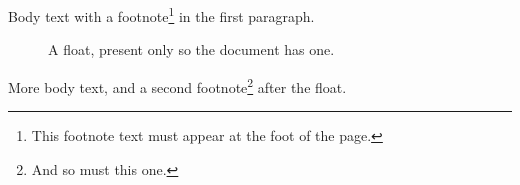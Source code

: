 \documentclass{article}
\begin{document}
Body text with a footnote\footnote{This footnote text must appear at the foot
of the page.} in the first paragraph.

\begin{figure}[h]
\centering
\caption{A float, present only so the document has one.}
\end{figure}

More body text, and a second footnote\footnote{And so must this one.} after
the float.
\end{document}
